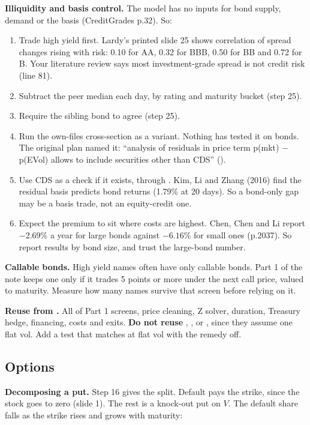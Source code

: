\documentclass[10pt,a4paper]{article}
\begin{document}
\textbf{Illiquidity and basis control.} The model has no inputs for bond supply, demand or the basis (CreditGrades p.32). So:
\begin{enumerate}[nosep]
\item Trade high yield first. Lardy's printed slide 25 shows correlation of spread changes rising with risk: 0.10 for AA, 0.32 for BBB, 0.50 for BB and 0.72 for B. Your literature review says most investment-grade spread is not credit risk (line 81).
\item Subtract the peer median each day, by rating and maturity bucket (step 25).
\item Require the sibling bond to agree (step 25).
\item Run the own-files cross-section as a variant. Nothing has tested it on bonds. The original plan named it: ``analysis of residuals in price term p(mkt) $-$ p(EVol) allows to include securities other than CDS'' ().
\item Use CDS as a check if it exists, through . Kim, Li and Zhang (2016) find the residual basis predicts bond returns (1.79\% at 20 days). So a bond-only gap may be a basis trade, not an equity-credit one.
\item Expect the premium to sit where costs are highest. Chen, Chen and Li report $-2.69\%$ a year for large bonds against $-6.16\%$ for small ones (p.2037). So report results by bond size, and trust the large-bond number.
\end{enumerate}

\textbf{Callable bonds.} High yield names often have only callable bonds. Part 1 of the note keeps one only if it trades 5 points or more under the next call price, valued to maturity. Measure how many names survive that screen before relying on it.

\textbf{Reuse from .} All of Part 1 screens, price cleaning, Z solver, duration, Treasury hedge, financing, costs and exits. \textbf{Do not reuse} , ,  or , since they assume one flat vol. Add a test that  matches  at flat vol with the remedy off.

\subsection{Options}\label{sec:options}

\textbf{Decomposing a put.} Step 16 gives the split. Default pays the strike, since the stock goes to zero (slide 1). The rest is a knock-out put on $V$. The default share falls as the strike rises and grows with maturity:
\end{document}
